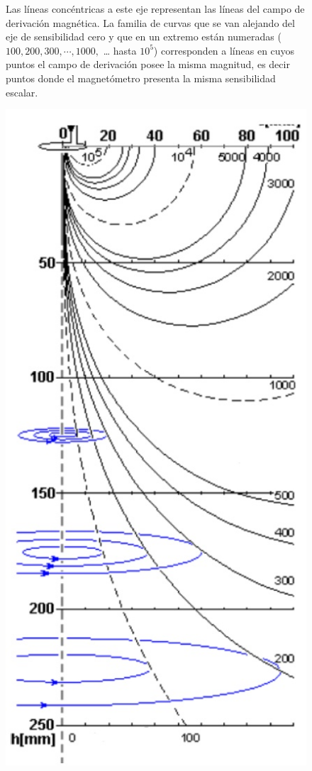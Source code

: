 \begin{figure}[H]
\begin{minipage}[b]{0.47\textwidth}
Las líneas concéntricas a este eje representan las líneas del campo de derivación magnética.
La familia de curvas que se van alejando del eje de sensibilidad cero y que en un extremo están numeradas ($100, 200, 300,\cdots, 1000,$ … hasta $10^{5}$) corresponden a líneas en cuyos puntos el campo de derivación posee la misma magnitud, es decir puntos donde el magnetómetro presenta la misma sensibilidad escalar.
  \vspace{1.5cm}
  \end{minipage}
  \hfill
  \begin{minipage}[b]{0.5\textwidth}
     \includegraphics[width=1.10\textwidth]{./Figures/fig617}

\end{minipage}
\end{figure}
